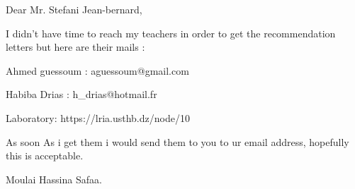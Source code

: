\documentclass[11pt,a4paper]{report}
\begin{document}



Dear Mr. Stefani Jean-bernard,


I didn't have time to reach my teachers in order to get the recommendation letters
but here are their mails :

Ahmed guessoum : aguessoum@gmail.com


Habiba Drias : h\_drias@hotmail.fr


Laboratory: https://lria.usthb.dz/node/10


As soon As i get them i would send them to you to ur email address, hopefully this is acceptable.

Moulai Hassina Safaa.
\end{document}
